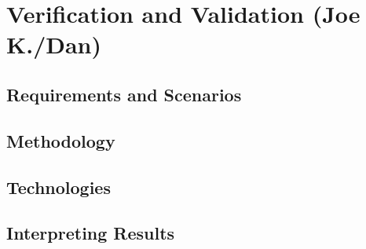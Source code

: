 \chapter{Verification and Validation (Joe K./Dan)}

\section{Requirements and Scenarios}
\section{Methodology}
\section{Technologies}
\section{Interpreting Results}
